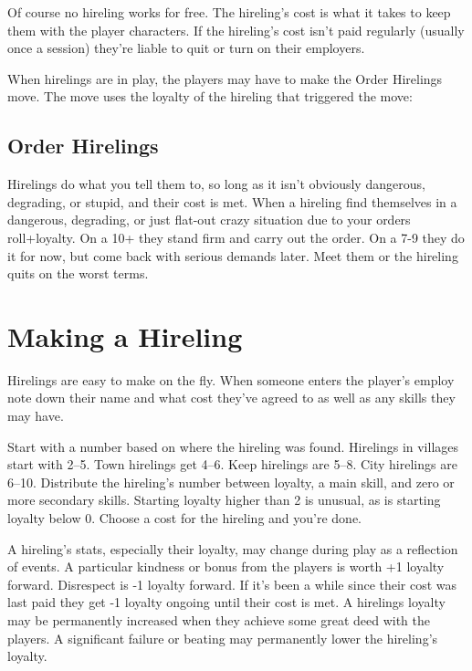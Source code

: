  

Of course no hireling works for free. The hireling's cost is what it takes to keep them with the player characters. If the hireling's cost isn't paid regularly (usually once a session) they're liable to quit or turn on their employers.

 

When hirelings are in play, the players may have to make the Order Hirelings move. The move uses the loyalty of the hireling that triggered the move:

 
\subsection{Order Hirelings}    
 

Hirelings do what you tell them to, so long as it isn't obviously dangerous, degrading, or stupid, and their cost is met. When a hireling find themselves in a dangerous, degrading, or just flat-out crazy situation due to your orders roll+loyalty. On a 10+ they stand firm and carry out the order. On a 7-9 they do it for now, but come back with serious demands later. Meet them or the hireling quits on the worst terms.

 
\section{Making a Hireling}  
 

Hirelings are easy to make on the fly. When someone enters the player's employ note down their name and what cost they've agreed to as well as any skills they may have.

 

Start with a number based on where the hireling was found. Hirelings in villages start with 2–5. Town hirelings get 4–6. Keep hirelings are 5–8. City hirelings are 6–10. Distribute the hireling's number between loyalty, a main skill, and zero or more secondary skills. Starting loyalty higher than 2 is unusual, as is starting loyalty below 0. Choose a cost for the hireling and you're done.

 

A hireling's stats, especially their loyalty, may change during play as a reflection of events. A particular kindness or bonus from the players is worth +1 loyalty forward. Disrespect is -1 loyalty forward. If it's been a while since their cost was last paid they get -1 loyalty ongoing until their cost is met. A hirelings loyalty may be permanently increased when they achieve some great deed with the players. A significant failure or beating may permanently lower the hireling's loyalty.

